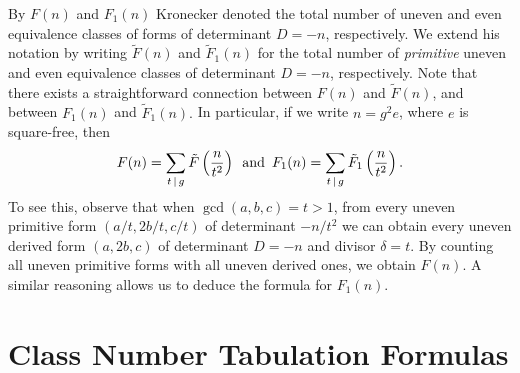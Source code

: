 \documentclass{mcom-l}
\theoremstyle{definition}
\begin{document}
By $F(n)$ and $F_1(n)$ Kronecker denoted the total number of uneven
and even equivalence classes of forms of determinant $D = -n$,
respectively. We extend his notation by writing $\tilde{F}(n)$ and
$\tilde{F}_1(n)$ for the total number of \emph{primitive} uneven and
even equivalence classes of determinant $D = -n$, respectively. Note
that there exists a straightforward connection between $F(n)$ and
$\tilde{F}(n)$, and between $F_1(n)$ and $\tilde{F}_1(n).$ In
particular, if we write $n = g^2e$, where $e$ is square-free, then
\begin{equation} \label{eq:F_and_F_tilde}
F(n) = \sum\limits_{t\,|\,g}\tilde{F}\left(\frac{n}{t^2}\right) \,\,\, \textnormal{and} \,\,\, F_1(n) = \sum\limits_{t\,|\,g}\tilde{F}_1\left(\frac{n}{t^2}\right).
\end{equation}
To see this, observe that when $\gcd(a, b, c) = t > 1$, from every
uneven primitive form $(a/t, 2b/t, c/t)$ of determinant $-n/t^2$ we
can obtain every uneven derived form $(a, 2b, c)$ of determinant $D
= -n$ and divisor $\delta = t$. By counting all uneven primitive
forms with all uneven derived ones, we obtain $F(n)$. A similar
reasoning allows us to deduce the formula for $F_1(n)$.

\section{Class Number Tabulation Formulas} \label{sec:clnum}
\end{document}
